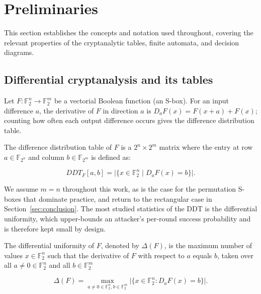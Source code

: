 \documentclass[runningheads]{llncs}
\newcommand{\F}{\mathbb{F}}
\begin{document}
\section{Preliminaries}
\label{sec:prelim}

This section establishes the concepts and notation used throughout, covering the
relevant properties of the cryptanalytic tables, finite automata, and decision
diagrams.

\subsection{Differential cryptanalysis and its tables}

Let $F:\F_2^{n}\to\F_2^{m}$ be a vectorial Boolean function (an S-box). For an
input difference $a$, the derivative of $F$ in direction $a$ is
$D_aF(x)=F(x+a)+F(x)$; counting how often each output difference occurs gives the
difference distribution table.

\begin{definition}
The difference distribution table of $F$ is a $2^n \times 2^m$ matrix where the entry at row $a \in \mathbb{F}_{2^n}$ and column $b \in \mathbb{F}_{2^m}$ is defined as:

    \begin{equation}
        DDT_{F}[a, b] = \big|\{x \in \mathbb{F}_{2}^{n} \mid D_{a}F(x) = b\}\big|.
    \end{equation}
\end{definition}

We assume $m=n$ throughout this work, as is the case for the permutation S-boxes that
dominate practice, and return to the rectangular case in
Section~\ref{sec:conclusion}. The most studied statistics of the DDT is the
differential uniformity, which upper-bounds an attacker's per-round success
probability and is therefore kept small by design.

\begin{definition}
The differential uniformity of $F$, denoted by $\Delta(F)$, is the maximum number of values $x \in \mathbb{F}_{2}^{n}$ such that the derivative of $F$ with respect to $a$ equals $b$, taken over all $a \ne 0 \in \mathbb{F}_{2}^{n}$ and all $b \in \mathbb{F}_{2}^{m}$

    \begin{equation}
        \Delta(F) = \max_{a \ne 0 \in \mathbb{F}_{2}^{n}, b \in \mathbb{F}_{2}^{m}} \big| \{x \in \mathbb{F}_{2}^{n} : D_{a}F(x) = b\} \big|.
    \end{equation}
\end{definition}
\end{document}
